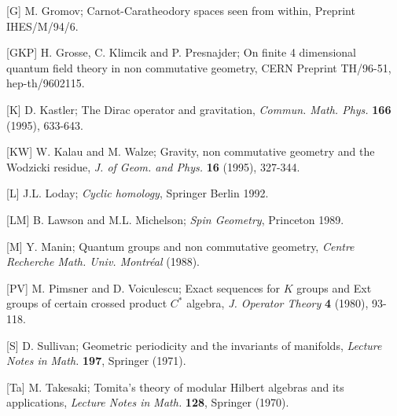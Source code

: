 \item{[G]} M. Gromov; Carnot-Caratheodory spaces seen
from within, Preprint \break IHES/M/94/6.

\item{[GKP]} H. Grosse, C. Klimcik and P. Presnajder; On
finite 4 dimensional quantum field theory in
non commutative geometry, CERN Preprint TH/96-51,
hep-th/9602115.

\item{[K]} D. Kastler; The Dirac operator and
gravitation, {\it Commun. Math. Phys.} {\bf 166} (1995),
633-643.

\item{[KW]} W. Kalau and M. Walze; Gravity, non
commutative geometry and the \break Wodzicki residue, {\it
J. of Geom. and Phys.} {\bf 16} (1995), 327-344.

\item{[L]} J.L. Loday; {\it Cyclic homology}, Springer
Berlin 1992.

\item{[LM]} B. Lawson and M.L. Michelson; {\it Spin
Geometry}, Princeton 1989.

\item{[M]} Y. Manin; Quantum groups and non commutative
geometry, {\it Centre Recherche Math. Univ.
Montr\'eal} (1988).

\item{[PV]} M. Pimsner and D. Voiculescu; Exact sequences
for $K$ groups and Ext groups of certain crossed product
$C^*$ algebra, {\it J. Operator Theory} {\bf 4} (1980),
93-118.

\item{[S]} D. Sullivan; Geometric periodicity and the
invariants of manifolds, {\it Lecture Notes in Math.}
{\bf 197}, Springer (1971).

\item{[Ta]} M. Takesaki; Tomita's theory of modular
Hilbert algebras and its applications, {\it Lecture Notes
in Math.} {\bf 128}, Springer (1970).






\bye


